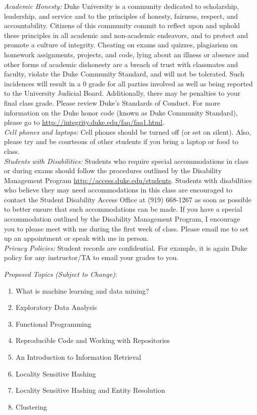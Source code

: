 \documentclass[11pt]{article}
\begin{document}
\emph{Academic Honesty:} Duke University is a community dedicated to scholarship, leadership, and service and to the principles of honesty, fairness, respect, and accountability. Citizens of this community commit to reflect upon and uphold these principles in all academic and non-academic endeavors, and to protect and promote a culture of integrity. Cheating on exams and quizzes, plagiarism on homework assignments, projects, and code, lying about an illness or absence and other forms of academic dishonesty are a breach of trust with classmates and faculty, violate the Duke Community Standard, and will not be tolerated. Such incidences will result in a 0 grade for all parties involved as well as being reported to the University Judicial Board. Additionally, there may be penalties to your final class grade. Please review Duke's Standards of Conduct. For more information on the Duke honor code (known as Duke Community Standard), please go to \url{http://integrity.duke.edu/faq/faq1.html}. \\

\emph{Cell phones and laptops:} Cell phones should be turned off (or set on silent). Also, please try and be courteous of other students if you bring a laptop or food to class. \\


\emph{Students with Disabilities:} Students who require special accommodations in class or during exams should follow the procedures outlined by the Disability Management Program \url{http://access.duke.edu/students}. Students with disabilities who believe they may need accommodations in this class are encouraged to contact the Student Disability Access Office at (919) 668-1267 as soon as possible to better ensure that such accommodations can be made. If you have a special accommodation outlined by the Disability Management Program, I encourage you to please meet with me during the first week of class. Please email me to set up an appointment or speak with me in person. \\

\emph{Privacy Policies:} 
Student records are confidential. For example, it is again Duke policy for any instructor/TA to email your grades to you. 

\emph{Proposed Topics (Subject to Change)}:
\begin{enumerate}
\item What is machine learning and data mining? 
\item Exploratory Data Analysis
\item Functional Programming  
\item Reproducible Code and Working with Repositories 
\item An Introduction to Information Retrieval
\item Locality Sensitive Hashing 
\item Locality Sensitive Hashing and Entity Resolution
\item Clustering 
\end{enumerate}
\end{document}
